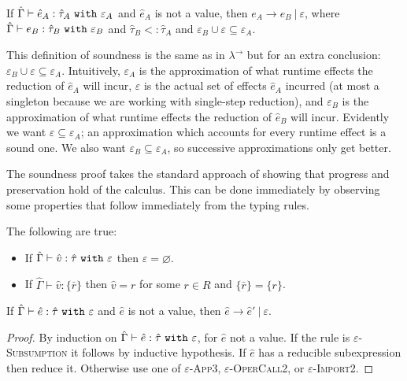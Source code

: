 \begin{theorem}[Soundness]
If $\hat \Gamma \vdash \hat e_A: \hat \tau_A~\mathtt{with}~ \varepsilon_A$ and $\hat e_A$ is not a value, then $e_A \longrightarrow e_B~|~\varepsilon$, where $\hat \Gamma \vdash e_B: \hat \tau_B~\mathtt{with}~ \varepsilon_B$ and $\hat \tau_B <: \hat \tau_A$ and $\varepsilon_B \cup \varepsilon \subseteq \varepsilon_A$.
\end{theorem}

\noindent
This definition of soundness is the same as in $\lambda^{\rightarrow}$ but for an extra conclusion: $\varepsilon_B \cup \varepsilon \subseteq \varepsilon_A$. Intuitively, $\varepsilon_A$ is the approximation of what runtime effects the reduction of $\hat e_A$ will incur, $\varepsilon$ is the actual set of effects $\hat e_A$ incurred (at most a singleton because we are working with single-step reduction), and $\varepsilon_B$ is the approximation of what runtime effects the reduction of $\hat e_B$ will incur. Evidently we want $\varepsilon \subseteq \varepsilon_A$; an approximation which accounts for every runtime effect is a sound one. We also want $\varepsilon_B \subseteq \varepsilon_A$, so successive approximations only get better.

The soundness proof takes the standard approach of showing that progress and preservation hold of the calculus. This can be done immediately by observing some properties that follow immediately from the typing rules.

\begin{lemma}
The following are true:
\begin{itemize}
	\setlength\itemsep{-0.7em}
	\item If $\hat \Gamma \vdash \hat v: \hat \tau~\mathtt{with}~ \varepsilon$ then $\varepsilon = \varnothing$.
	\item If $\hat \Gamma \vdash \hat v: \{ \bar r \}$ then $\hat v = r$ for some $r \in R$ and $\{ \bar r \} = \{ r \}$.
\end{itemize}
\end{lemma}


\begin{theorem}[Progress]
If $\hat \Gamma \vdash \hat e: \hat \tau~\mathtt{with}~ \varepsilon$ and $\hat e$ is not a value, then $\hat e \longrightarrow \hat e'~|~\varepsilon$.
\end{theorem}

\begin{proof} By induction on $\hat \Gamma \vdash \hat e: \hat \tau~\mathtt{with}~ \varepsilon$, for $\hat e$ not a value. If the rule is \textsc{$\varepsilon$-Subsumption} it follows by inductive hypothesis. If $\hat e$ has a reducible subexpression then reduce it. Otherwise use one of \textsc{$\varepsilon$-App3}, \textsc{$\varepsilon$-OperCall2}, or \textsc{$\varepsilon$-Import2}.
\end{proof}

